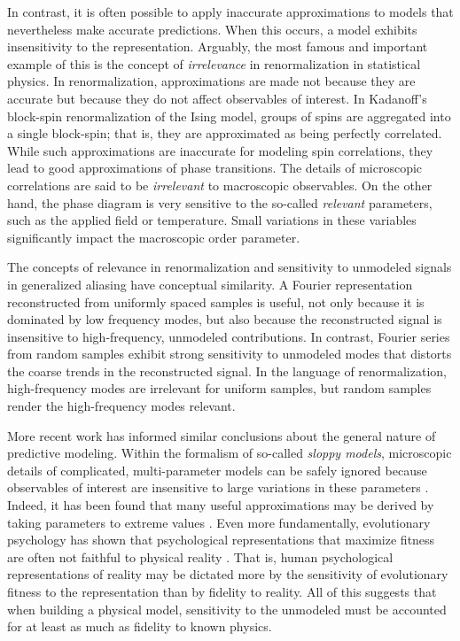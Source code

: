 \documentclass[twocolumn,aps,prx,superscriptaddress,10pt]{revtex4-2}
\newcommand{\0}{\bm{0}}
\begin{document}
In contrast, it is often possible to apply inaccurate approximations to models that nevertheless make accurate predictions.
When this occurs, a model exhibits insensitivity to the representation.
Arguably, the most famous and important example of this is the concept of \emph{irrelevance} in renormalization in statistical physics.
In renormalization, approximations are made not because they are accurate but because they do not affect observables of interest.
In Kadanoff's block-spin renormalization of the Ising model, groups of spins are aggregated into a single block-spin; that is, they are approximated as being perfectly correlated.
While such approximations are inaccurate for modeling spin correlations, they lead to good approximations of phase transitions.
The details of microscopic correlations are said to be \emph{irrelevant} to macroscopic observables.
On the other hand, the phase diagram is very sensitive to the so-called \emph{relevant} parameters, such as the applied field or temperature.
Small variations in these variables significantly impact the macroscopic order parameter.

The concepts of relevance in renormalization and sensitivity to unmodeled signals in generalized aliasing have conceptual similarity.
A Fourier representation reconstructed from uniformly spaced samples is useful, not only because it is dominated by low frequency modes, but also because the reconstructed signal is insensitive to high-frequency, unmodeled contributions.
In contrast, Fourier series from random samples exhibit strong sensitivity to unmodeled modes that distorts the coarse trends in the reconstructed signal.
In the language of renormalization, high-frequency modes are irrelevant for uniform samples, but random samples render the high-frequency modes relevant.

More recent work has informed similar conclusions about the general nature of predictive modeling.
Within the formalism of so-called \emph{sloppy models}, microscopic details of complicated, multi-parameter models can be safely ignored because observables of interest are insensitive to large variations in these parameters \cite{machta2013parameter,transtrum2015perspective, quinn2022information}.
Indeed, it has been found that many useful approximations may be derived by taking parameters to extreme values \cite{transtrum2014model}.
Even more fundamentally, evolutionary psychology has shown that psychological representations that maximize fitness are often not faithful to physical reality \cite{hoffman2015interface}.
That is, human psychological representations of reality may be dictated more by the sensitivity of evolutionary fitness to the representation than by fidelity to reality.
All of this suggests that when building a physical model, sensitivity to the unmodeled must be accounted for at least as much as fidelity to known physics.  
\end{document}
